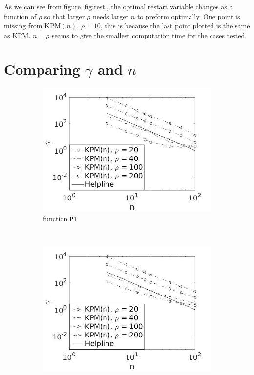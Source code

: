 As we can see from figure \ref{fig:rest}, the optimal restart variable changes as a function of $\rho$ so that larger $\rho$ needs larger $n$ to preform optimally. One point is missing from KPM$(n)$, $\rho = 10$, this is because the last point plotted is the same as KPM. $n = \rho$ seams to give the smallest computation time for the cases tested. 
\section{Comparing $\gamma$ and $n$} \label{sec:rrest}
\begin{figure}[H]
        \centering
        \begin{subfigure}[b]{0.45\textwidth}
                \includegraphics[width=\textwidth]{fig/s3antvsm1}
                \caption{function \texttt{P1}}
                \label{fig:ant1}
        \end{subfigure}%
~
        \begin{subfigure}[b]{0.45\textwidth}
                \includegraphics[width=\textwidth]{fig/s4antvsm2}

\end{subfigure}
\end{figure}
